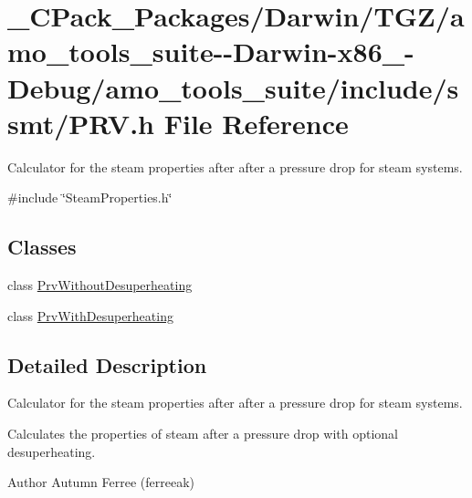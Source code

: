 \hypertarget{___c_pack___packages_2_darwin_2_t_g_z_2amo__tools__suite--_darwin-x86__64-_debug_2amo__tools__suite_2include_2ssmt_2_p_r_v_8h}{}\section{\+\_\+\+C\+Pack\+\_\+\+Packages/\+Darwin/\+T\+G\+Z/amo\+\_\+tools\+\_\+suite-\/-\/\+Darwin-\/x86\+\_-\/\+Debug/amo\+\_\+tools\+\_\+suite/include/ssmt/\+P\+RV.h File Reference}
\label{___c_pack___packages_2_darwin_2_t_g_z_2amo__tools__suite--_darwin-x86__64-_debug_2amo__tools__suite_2include_2ssmt_2_p_r_v_8h}


Calculator for the steam properties after after a pressure drop for steam systems.  


{\ttfamily \#include \char`\"{}Steam\+Properties.\+h\char`\"{}}\newline
\subsection*{Classes}
\begin{DoxyCompactItemize}
\item 
class \hyperlink{class_prv_without_desuperheating}{Prv\+Without\+Desuperheating}
\item 
class \hyperlink{class_prv_with_desuperheating}{Prv\+With\+Desuperheating}
\end{DoxyCompactItemize}


\subsection{Detailed Description}
Calculator for the steam properties after after a pressure drop for steam systems. 

Calculates the properties of steam after a pressure drop with optional desuperheating.

\begin{DoxyAuthor}{Author}
Autumn Ferree (ferreeak) 
\end{DoxyAuthor}
